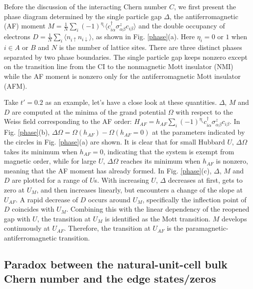 \documentclass[12pt]{iopart}
\begin{document}
\par Before the discussion of the interacting Chern number $C$, we first present the phase diagram determined by the single particle gap $\Delta$, the antiferromagnetic (AF) moment $M=\frac{1}{N}\sum_i(-1)^{\eta_i}\langle c^\dagger_{i\alpha}\sigma^z_{\alpha\beta}c_{i\beta}\rangle$ and the double occupancy of electrons $D=\frac{1}{N}\sum_i\langle n_{i\uparrow}n_{i\downarrow}\rangle$, as shown in Fig. \ref{phase}(a). Here $\eta_i=0$ or $1$ when $i\in A$ or $B$ and $N$ is the number of lattice sites. There are three distinct phases separated by two phase boundaries. The single particle gap keeps nonzero except on the transition line from the CI to the nonmagnetic Mott insulator (NMI) while the AF moment is nonzero only for the antiferromagnetic Mott insulator (AFM).

\par Take $t'=0.2$ as an example, let's have a close look at these quantities. $\Delta$, $M$ and $D$ are computed at the minima of the grand potential $\Omega$ with respect to the Weiss field corresponding to the AF order: $H_{AF}=h_{AF}\sum_i(-1)^{\eta_i}c^\dagger_{i\alpha}\sigma^z_{\alpha\beta}c_{i\beta}$. In Fig. \ref{phase}(b), $\Delta\Omega=\Omega(h_{AF})-\Omega(h_{AF}=0)$ at the parameters indicated by the circles in Fig. \ref{phase}(a) are shown. It is clear that for small Hubbard $U$, $\Delta\Omega$ takes its minimum when $h_{AF}=0$, indicating that the system is exempt from magnetic order, while for large $U$, $\Delta\Omega$ reaches its minimum when $h_{AF}$ is nonzero, meaning that the AF moment has already formed. In Fig. \ref{phase}(c), $\Delta$, $M$ and $D$ are plotted for a range of $U$s. With increasing $U$, $\Delta$ decreases at first, gets to zero at $U_M$, and then increases linearly, but encounters a change of the slope at $U_{AF}$. A rapid decrease of $D$ occurs around $U_M$, specifically the inflection point of $D$ coincides with $U_M$. Combining this with the linear dependency of the reopened gap with $U$, the transition at $U_M$ is identified as the Mott transition. $M$ develops continuously at $U_{AF}$. Therefore, the transition at $U_{AF}$ is the paramagnetic-antiferromagnetic transition.

\subsection{Paradox between the natural-unit-cell bulk Chern number and the edge states/zeros}\label{Paradox}
\end{document}
